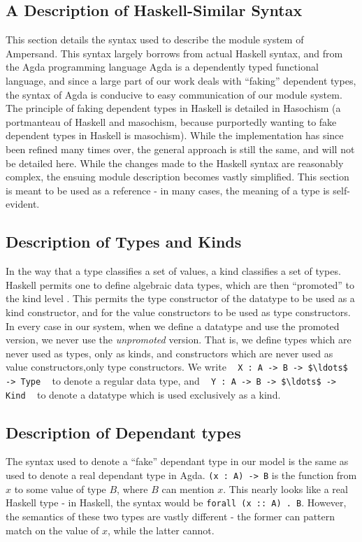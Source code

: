 \noindent
\subsection{A Description of Haskell-Similar Syntax}\label{subsec:HaskellSyntax}

This section details the syntax used to describe the module system of
Ampersand. This syntax largely borrows from actual Haskell syntax, and from the
Agda programming language%
 Agda is a dependently typed functional
language, and since a large part of our work deals with ``faking'' dependent
types, the syntax of Agda is conducive to easy communication of our module 
system. The
principle of faking dependent types in Haskell is detailed in
Hasochism \citep{hasochism} 
(a portmanteau of Haskell and masochism, because
purportedly wanting to fake dependent types in Haskell is masochism). While the
implementation has since been refined many times over, the general approach is 
still the
same, and will not be detailed here.
While the changes made to the Haskell syntax are reasonably complex, the 
ensuing 
module description becomes vastly simplified. This section is meant to be used
as a reference - in many cases, the meaning of a type is self-evident. 

\noindent
\subsection{Description of Types and Kinds}
In the way that a type classifies a set of values, a kind classifies a set of
types. Haskell permits one to define algebraic data types, which are then 
``promoted''
to the kind level \citep{promotion}. 
This permits the type constructor of the datatype to be used
as a kind constructor, and for the value constructors to be used as type 
constructors. In every case in our system, when we define a datatype and use 
the promoted version, we never use the \emph{unpromoted} version. That is, we 
define types which are never used as types, only as kinds, and constructors 
which are never used as value constructors,only type constructors. We write 
\,\,\,
\lstinline!X : A -> B -> $\ldots$ -> Type!
\,\,\, 
to denote a regular data type, and 
\,\,\,
\lstinline!Y : A -> B -> $\ldots$ -> Kind!
\,\,\, 
to denote a datatype
which is used exclusively as a kind. 

\noindent
\subsection{Description of Dependant types}
The syntax used to denote a ``fake'' dependant type in our model is the same 
as used to denote a real dependant type in Agda. \lstinline!(x : A) -> B! is 
the function
from $x$ to some value of type $B$, where $B$ can mention $x$. This nearly 
looks like a 
real Haskell type - in Haskell, the syntax would be \texttt{forall (x :: A) . 
B}. However, 
the semantics of these two types are vastly different - the former can pattern 
match
on the value of $x$, while the latter cannot. 

